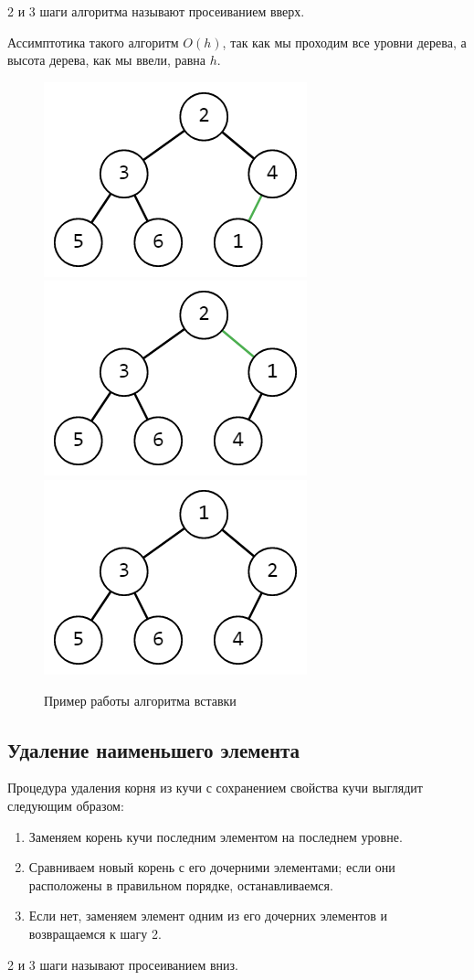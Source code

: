 \documentclass{article}
\begin{document}
2 и 3 шаги алгоритма называют просеиванием вверх.

Ассимптотика такого алгоритм $O(h)$, так как мы проходим все уровни дерева, а высота дерева, как мы ввели, равна $h$.

\begin{figure}[h]
    \centering
    \includegraphics[width=0.3\linewidth]{2.png}
    \includegraphics[width=0.3\linewidth]{3.png}
    \includegraphics[width=0.3\linewidth]{4.png}
    \caption{Пример работы алгоритма вставки}
    \label{fig:mpr}
\end{figure}

\subsection{Удаление наименьшего элемента}

Процедура удаления корня из кучи с сохранением свойства кучи выглядит следующим образом:

\begin{enumerate}
    \item Заменяем корень кучи последним элементом на последнем уровне.
    \item Сравниваем новый корень с его дочерними элементами; если они расположены в правильном порядке, останавливаемся.
    \item Если нет, заменяем элемент одним из его дочерних элементов и возвращаемся к шагу 2. 
\end{enumerate}

2 и 3 шаги называют просеиванием вниз.
\end{document}
